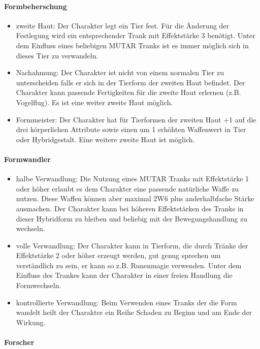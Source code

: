 \documentclass{article}
\begin{document}
\paragraph{Formbeherschung}

\begin{itemize}
\item zweite Haut: Der Charakter legt ein Tier fest. Für die Änderung der Festlegung wird ein entsprechender Trank mit Effektstärke 3 benötigt. Unter dem Einfluss eines beliebigen MUTAR Tranks ist es immer möglich sich in dieses Tier zu verwandeln.
\item Nachahmung: Der Charakter ist nicht von einem normalen Tier zu unterscheiden falls er sich in der Tierform der zweiten Haut befindet. Der Charakter kann passende Fertigkeiten für die zweite Haut erlernen (z.B. Vogelflug). Es ist eine weiter zweite Haut möglich.
\item Formmeister: Der Charakter hat für Tierformen der zweiten Haut +1 auf die drei körperlichen Attribute sowie einen um 1 erhöhten Waffenwert in Tier oder Hybridgestalt. Eine weitere zweite Haut ist möglich.
\end{itemize}

\paragraph{Formwandler}

\begin{itemize}
\item halbe Verwandlung: Die Nutzung eines MUTAR Tranks mit Effektstärke 1 oder höher erlaubt es dem Charakter eine passende natürliche Waffe zu nutzen. Diese Waffen können aber maximal 2W6 plus anderhalbfache Stärke ausmachen. Der Charakter kann bei höheren Effektstärken des Tranks in dieser Hybridform zu bleiben und beliebig mit der Bewegungshandlung zu wechseln.
\item volle Verwandlung: Der Charakter kann in Tierform, die durch Tränke der Effektstärke 2 oder höher erzeugt werden, gut genug sprechen um verständlich zu sein, er kann so z.B. Runenmagie verwenden. Unter dem Einfluss des Trankes kann der Charakter in einer freien Handlung die Formwechseln.
\item kontrollierte Verwandlung: Beim Verwenden eines Tranks der die Form wandelt heilt der Charakter ein Reihe Schaden zu Beginn und am Ende der Wirkung.
\end{itemize}

\paragraph{Forscher}
\end{document}
